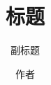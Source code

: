 \documentclass{ctexbeamer}
\begin{document}
    \title{标题}
    \subtitle{副标题}
    \author{作者}
    \maketitle
\end{document}
